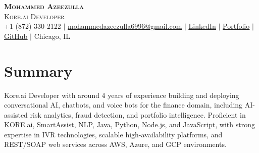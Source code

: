 \documentclass[letterpaper,11pt]{article}
\begin{document}
\begin{center}
    \textbf{\Huge \scshape Mohammed Azeezulla} \\ \vspace{1pt}
    \small\textsc{Kore.ai Developer} \\ \vspace{1pt}
    \small +1 (872) 330-2122 $|$ \href{mailto:mohammedazeezulla6996@gmail.com}{\underline{mohammedazeezulla6996@gmail.com}} $|$ \href{LINKEDIN_URL}{\underline{LinkedIn}} $|$ \href{PORTFOLIO_URL}{\underline{Portfolio}} $|$ \href{GITHUB_URL}{\underline{GitHub}} $|$ Chicago, IL
\end{center}

\section{Summary}
\vspace{-4pt}
\small{Kore.ai Developer with around 4 years of experience building and deploying conversational AI, chatbots, and voice bots for the finance domain, including AI-assisted risk analytics, fraud detection, and portfolio intelligence. Proficient in KORE.ai, SmartAssist, NLP, Java, Python, Node.js, and JavaScript, with strong expertise in IVR technologies, scalable high-availability platforms, and REST/SOAP web services across AWS, Azure, and GCP environments.}
\vspace{2pt}
\end{document}

